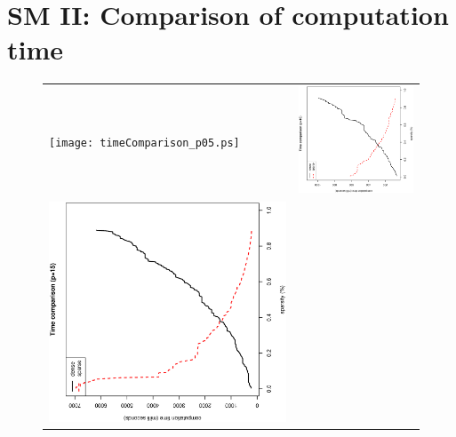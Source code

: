 \documentclass[a4paper]{article}
\begin{document}
\section*{SM II: Comparison of computation time}
\begin{figure}[h!]
\centering
\begin{tabular}{ll}
\texttt{[image: timeComparison\_p05.ps]} &
\includegraphics[scale=0.28,angle=270]{timeComparison_p10.ps}
\\
\includegraphics[scale=0.28,angle=270]{timeComparison_p15.ps} &

\end{tabular}
\end{figure}
\end{document}
